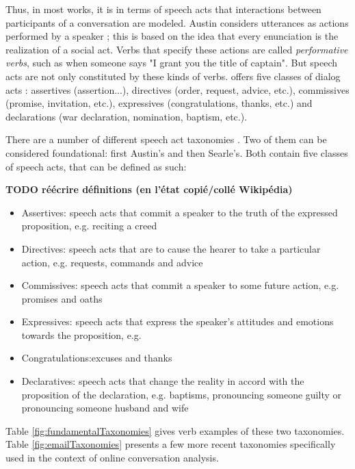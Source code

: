 \documentclass[11pt]{article}
\begin{document}
Thus, in most works, it is in terms of speech acts that interactions between participants of a conversation are modeled. Austin considers utterances as actions performed by a speaker ; this is based on the idea that every enunciation is the realization of a social act. Verbs that specify these actions are called \textit{performative verbs}, such as when someone says "I grant you the title of captain". But speech acts are not only constituted by these kinds of verbs. \cite{searle1976taxonomy} offers five classes of dialog acts : assertives (assertion...), directives (order, request, advice, etc.), commissives (promise, invitation, etc.), expressives (congratulations, thanks, etc.) and declarations (war declaration, nomination, baptism, etc.).

There are a number of different speech act taxonomies \cite{traum200020}. Two of them can be considered foundational: first Austin's and then Searle's. Both contain five classes of speech acts, that can be defined as such:

\textbf{TODO réécrire définitions (en l'état copié/collé Wikipédia)}

\begin{itemize}
	\item Assertives: speech acts that commit a speaker to the truth of the expressed proposition, e.g. reciting a creed
	\item Directives: speech acts that are to cause the hearer to take a particular action, e.g. requests, commands and advice
	\item Commissives: speech acts that commit a speaker to some future action, e.g. promises and oaths
	\item Expressives: speech acts that express the speaker's attitudes and emotions towards the proposition, e.g. \item Congratulations:excuses and thanks
	\item Declaratives: speech acts that change the reality in accord with the proposition of the declaration, e.g. baptisms, pronouncing someone guilty or pronouncing someone husband and wife
\end{itemize}

Table \ref{fig:fundamentalTaxonomies} gives verb examples of these two taxonomies. Table \ref{fig:emailTaxonomies} presents a few more recent taxonomies specifically used in the context of online conversation analysis.
\end{document}
